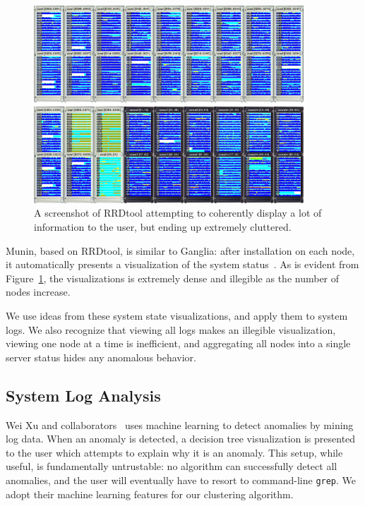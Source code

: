 \documentclass[conference]{style/acmsiggraph}
\begin{document}
\begin{figure}[p]
    \centering
    \includegraphics[width=0.9\textwidth]{images/rrdtool.png}
    \caption{A screenshot of RRDtool attempting to coherently display a lot of information to the user, but ending up extremely cluttered.\protect\footnotemark}
    \label{fig:rrdtool}
\end{figure}

Munin, based on RRDtool, is similar to Ganglia: after installation on each node, it automatically presents a visualization of the system status~\cite{Oetiker99}.
As is evident from Figure~\ref{fig:rrdtool}, the visualizations is extremely dense and illegible as the number of nodes increase.

We use ideas from these system state visualizations, and apply them to system logs.
We also recognize that viewing all logs makes an illegible visualization, viewing one node at a time is inefficient, and aggregating all nodes into a single server status hides any anomalous behavior.

\subsection{System Log Analysis}

Wei Xu and collaborators~\cite{Xu09} uses machine learning to detect anomalies by mining log data.
When an anomaly is detected, a decision tree visualization is presented to the user which attempts to explain why it is an anomaly.
This setup, while useful, is fundamentally untrustable: no algorithm can successfully detect all anomalies, and the user will eventually have to resort to command-line \texttt{grep}.
We adopt their machine learning features for our clustering algorithm.
\end{document}
